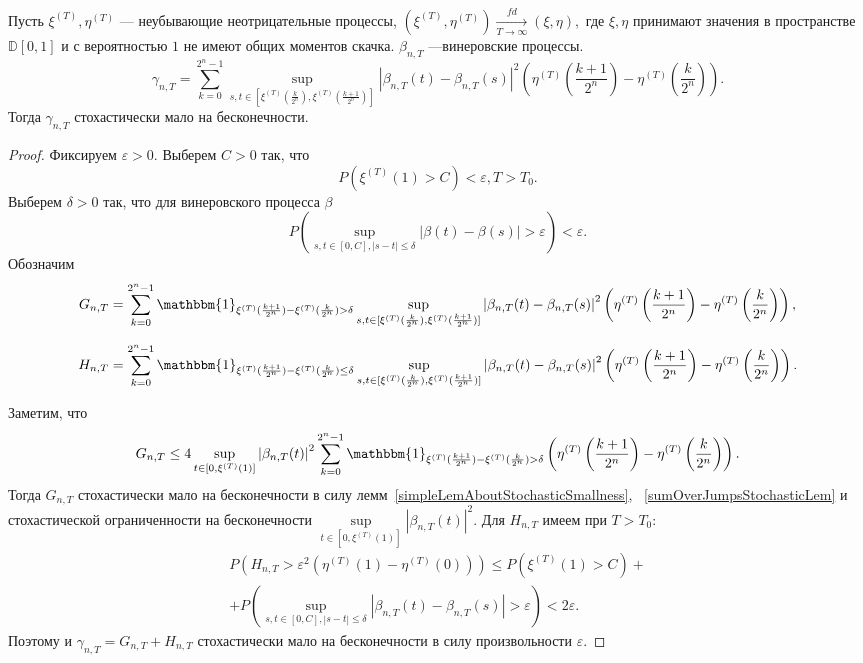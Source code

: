 \documentclass[12pt, a4paper, titlepage]{article}
\begin{document}
 \begin{lem}\label{mostSubtleGammaNTLem}
  Пусть $\xi^{(T)}, \eta^{(T)}$ --- неубывающие неотрицательные процессы,
  $(\xi^{(T)}, \eta^{(T)})\xrightarrow[T\to\infty]{fd} (\xi, \eta),$
  где $\xi, \eta$ принимают значения в пространстве $\mathbb{D}[0,1]$
  и с вероятностью $1$ не имеют общих моментов скачка. $\beta_{n, T}$ ---винеровские
  процессы. 
  $$\gamma_{n,T}=\sum\limits_{k=0}^{2^n-1}
  \sup\limits_{s,t \in [\xi^{(T)}(\frac{k}{2^n}), \xi^{(T)}(\frac{k+1}{2^n})]}
  \left|\beta_{n,T}(t)-\beta_{n,T}(s)\right|^2
  \left(\eta^{(T)}\left(\frac{k+1}{2^n}\right)-\eta^{(T)}\left(\frac{k}{2^n}\right)\right).$$
  Тогда $\gamma_{n,T}$ стохастически мало на бесконечности. 
 \end{lem}
 \begin{proof}
 Фиксируем $\varepsilon>0$. 
 Выберем $C>0$ так, что 
 $$P\left(\xi^{(T)}(1)>C\right)<\varepsilon, T>T_0.$$
 Выберем $\delta>0$ так, что для винеровского процесса $\beta$
 $$P\left(\sup\limits_{s, t \in [0, C], |s-t| \le \delta}|\beta(t)-\beta(s)|>\varepsilon\right) <\varepsilon.$$ 
 Обозначим 
 $$G_{n, T} = \sum\limits_{k=0}^{2^n-1} \mathbbm{1}_{\xi^{(T)}(\frac{k+1}{2^n})-\xi^{(T)}(\frac{k}{2^n})>\delta}
  \sup\limits_{s,t \in [\xi^{(T)}(\frac{k}{2^n}), \xi^{(T)}(\frac{k+1}{2^n})]}  
  \left|\beta_{n,T}(t)-\beta_{n,T}(s)\right|^2
  \left(\eta^{(T)}\left(\frac{k+1}{2^n}\right)-\eta^{(T)}\left(\frac{k}{2^n}\right)\right),$$
 
 $$H_{n, T} = \sum\limits_{k=0}^{2^n-1}
  \mathbbm{1}_{\xi^{(T)}(\frac{k+1}{2^n})-\xi^{(T)}(\frac{k}{2^n}) \le \delta}
  \sup\limits_{s,t \in [\xi^{(T)}(\frac{k}{2^n}), \xi^{(T)}(\frac{k+1}{2^n})]}  
  \left|\beta_{n,T}(t)-\beta_{n,T}(s)\right|^2
  \left(\eta^{(T)}\left(\frac{k+1}{2^n}\right)-\eta^{(T)}\left(\frac{k}{2^n}\right)\right).$$
  
  Заметим, что 
  $$ G_{n,T} \le 
   4 \sup\limits_{t \in [0, \xi^{(T)}(1)]}
  \left|\beta_{n,T}(t)\right|^2
  \sum\limits_{k=0}^{2^n-1} \mathbbm{1}_{\xi^{(T)}(\frac{k+1}{2^n})-\xi^{(T)}(\frac{k}{2^n})>\delta}
  \left(\eta^{(T)}\left(\frac{k+1}{2^n}\right)-\eta^{(T)}\left(\frac{k}{2^n}\right)\right).
 $$  
 Тогда $G_{n, T}$ стохастически мало на бесконечности
 в силу лемм~\ref{simpleLemAboutStochasticSmallness},
 ~\ref{sumOverJumpsStochasticLem} и стохастической ограниченности на бесконечности
 $\sup\limits_{t \in [0, \xi^{(T)}(1)]}\left|\beta_{n,T}(t)\right|^2$.
 Для $H_{n, T}$ имеем при $T>T_0$: 
 \begin{multline*}
   P\left(H_{n, T} > \varepsilon^2 \left(\eta^{(T)}(1)-\eta^{(T)}(0)\right)\right)\le 
  P\left(\xi^{(T)}(1)>C\right)+\\+
  P\left(\sup\limits_{s, t \in [0, C], |s-t| \le \delta}|\beta_{n,T}(t)-\beta_{n,T}(s)|>\varepsilon\right) <
  2\varepsilon.
 \end{multline*}
  Поэтому и $\gamma_{n,T}=G_{n,T}+H_{n,T}$ стохастически мало на бесконечности в силу произвольности $\varepsilon.$ 
 \end{proof}
 
\end{document}

